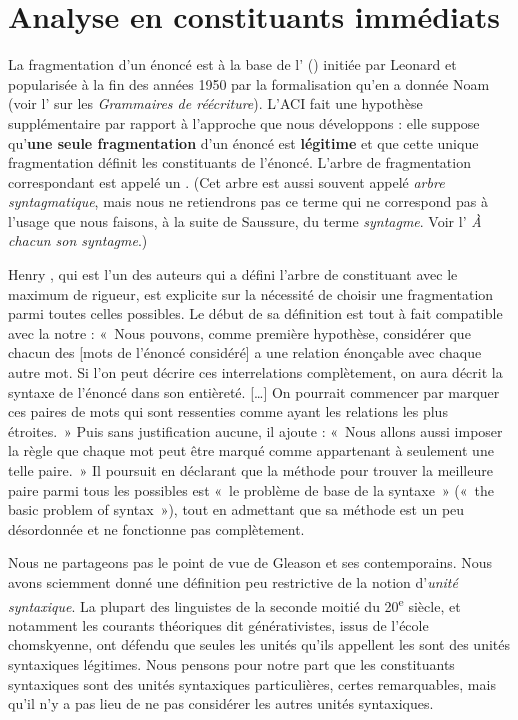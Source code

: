 \section{Analyse en constituants immédiats}\label{sec:3.2.25}

La fragmentation d’un énoncé est à la base de l’ () initiée par Leonard \citet{bloomfield1933language} et popularisée à la fin des années 1950 par la formalisation qu’en a donnée Noam \citet{Chomsky1957} (voir l’ sur les \textit{Grammaires de réécriture}). L’ACI fait une hypothèse supplémentaire par rapport à l’approche que nous développons : elle suppose qu’\textbf{une seule fragmentation} d’un énoncé est \textbf{légitime} et que cette unique fragmentation définit les constituants de l’énoncé. L’arbre de fragmentation correspondant est appelé un . (Cet arbre est aussi souvent appelé \textit{arbre syntagmatique}, mais nous ne retiendrons pas ce terme qui ne correspond pas à l’usage que nous faisons, à la suite de Saussure, du terme \textit{syntagme}. Voir l’ \textit{À chacun son syntagme}.)

Henry \citet{Gleason1955}, qui est l’un des auteurs qui a défini l’arbre de constituant avec le maximum de rigueur, est explicite sur la nécessité de choisir une fragmentation parmi toutes celles possibles. Le début de sa définition est tout à fait compatible avec la notre : «~Nous pouvons, comme première hypothèse, considérer que chacun des [mots de l’énoncé considéré] a une relation énonçable avec chaque autre mot. Si l’on peut décrire ces interrelations complètement, on aura décrit la syntaxe de l’énoncé dans son entièreté. […] On pourrait commencer par marquer ces paires de mots qui sont ressenties comme ayant les relations les plus étroites.~» Puis sans justification aucune, il ajoute : «~Nous allons aussi imposer la règle que chaque mot peut être marqué comme appartenant à seulement une telle paire.~» Il poursuit en déclarant que la méthode pour trouver la meilleure paire parmi tous les possibles est «~le problème de base de la syntaxe~» («~the basic problem of syntax~»), tout en admettant que sa méthode est un peu désordonnée et ne fonctionne pas complètement.

Nous ne partageons pas le point de vue de Gleason et ses contemporains. Nous avons sciemment donné une définition peu restrictive de la notion d’\textit{unité syntaxique}. La plupart des linguistes de la seconde moitié du 20\textsuperscript{e} siècle, et notamment les courants théoriques dit générativistes, issus de l’école chomskyenne, ont défendu que seules les unités qu’ils appellent les  sont des unités syntaxiques légitimes. Nous pensons pour notre part que les constituants syntaxiques sont des unités syntaxiques particulières, certes remarquables, mais qu’il n’y a pas lieu de ne pas considérer les autres unités syntaxiques.

